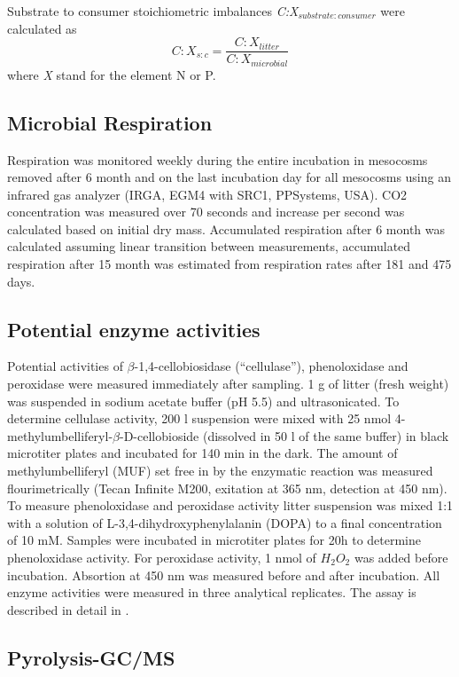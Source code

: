 Substrate to consumer stoichiometric imbalances \emph{C:X$_{substrate : consumer}$} were calculated as
\begin{equation}
 C:X_{s:c}=\frac{C:X_{litter}}{C:X_{microbial}} \label{eq:imbal}
\end{equation}
where \emph{X} stand for the element N or P.

\subsection*{Microbial Respiration}
Respiration was monitored weekly during the entire incubation in mesocosms removed after 6 month and on the last incubation day for all mesocosms using an infrared gas analyzer (IRGA, EGM4 with SRC1, PPSystems, USA). CO2 concentration was measured over 70 seconds and increase per second was calculated based on initial dry mass. Accumulated respiration after 6 month was calculated assuming linear transition between measurements, accumulated respiration after 15 month was estimated from respiration rates after 181 and 475 days.

\subsection*{Potential enzyme activities}

Potential activities of $\beta$-1,4-cellobiosidase (``cellulase''), phenoloxidase and peroxidase were measured immediately after sampling. 1 g of litter (fresh weight) was suspended in sodium acetate buffer (pH 5.5) and ultrasonicated. To determine cellulase activity, 200 \textmu l suspension were mixed with 25 nmol 4-methylumbelliferyl-$\beta$-D-cellobioside (dissolved in 50 \textmu l of the same buffer) in black microtiter plates and incubated for 140 min in the dark. The amount of methylumbelliferyl (MUF) set free in by the enzymatic reaction was measured flourimetrically (Tecan Infinite M200, exitation at 365 nm, detection at 450 nm). To measure phenoloxidase and peroxidase activity litter suspension was mixed 1:1 with a solution of L-3,4-dihydroxyphenylalanin (DOPA) to a final concentration of 10 mM. Samples were incubated in microtiter plates for 20h to determine phenoloxidase activity. For peroxidase activity, 1 nmol of $H_2O_2$ was added before incubation. Absortion at 450 nm was measured before and 
after incubation. All enzyme activities were measured in three analytical replicates. The assay is described in detail in \cite{Kaiser2010b}.

\subsection*{Pyrolysis-GC/MS}

